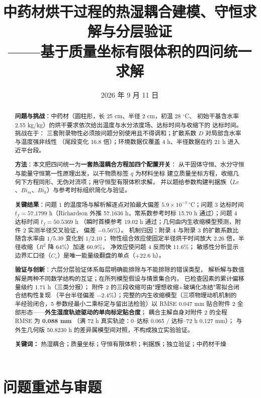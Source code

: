 \documentclass[12pt,a4paper]{ctexart}
\title{\textbf{中药材烘干过程的热湿耦合建模、守恒求解与分层验证}\\[2pt]
——基于质量坐标有限体积的四问统一求解}
\author{}
\date{2026 年 9 月 11 日}
\numberwithin{equation}{section}
\begin{document}
\maketitle

\begin{abstract}
\noindent\textbf{问题与挑战}：中药材（圆柱形，长 25 cm、半径 2 cm，初温 28 ${}^\circ$C、
初始干基含水率 2.55 kg/kg）的烘干要求依次给出温度与水分浓度场、达标时间与收缩下的
达标时间。挑战在于：
三套附录物性必须按问题分别使用且不得调和；扩散系数 $D$ 对局部含水率与温度强非线性
（尾段变化 16.8 倍）；环境数据仅覆盖 4 h、半径数据在约 21 h 进入近平台段。

\smallskip\noindent\textbf{方法}：本文把四问统一为\textbf{一套热湿耦合方程加四个配置开关}：
从干固体守恒、水分守恒与能量守恒第一性原理出发，以干物质标签 $q$ 为材料坐标
建立质量坐标方程，收缩几何下方程同形、无伪对流项；用守恒型有限体积求解，
并以题给参数构建判据族（$Le$、$Bi_m$、$Bi_h$）与参考时标组织简化与验证。

\smallskip\noindent\textbf{关键结果}：问题 1 的温度场与解析解逐点对拍最大偏差
$5.9\times10^{-7}\,^{\circ}$C；问题 3 达标时间 $t_f=57.1799$ h（Richardson 外推
57.1636 h，常系数参考时标 15.70 h 通过）；问题 4 达标时间 $t_f=50.5369$ h
（瞬时首模参考 19.02 h 通过；几何由内生收缩模型预测，附件 2 实测半径交叉验证，
偏差 $-0.56\%$）。
机制归因：附录 4 与附录 3 的扩散系数比随含水率由 $1/5.39$ 变化到 $1/2.10$；
物性组合效应使固定半径烘干时间放大 $2.26$ 倍，半径收缩（$R^2$ 降 64\%）加速 $60.9\%$，
净效应使问题 4 反而快 $11.6\%$；
敏感性分析显示边界汇口径（$C_e$）是唯一能量级翻盘的单点（$+22.6$ h）。

\smallskip\noindent\textbf{验证与创新}：六层分层验证体系每层明确能排除与不能排除的错误类型，
解析解与数值解是两种不同数学结构的互证；在所列模型假设与情景集合内，
已检查因素的累计偏移量级约 1.71 h（三类分报）；
附件 2 的三段收缩可由"理想收缩+玻璃化冻结"零拟合闭合结构性复现
（平台半径偏差 $-2.4\%$）；完整的内生收缩模型（三项物理动机机制的
半经验闭合，5 参数经最小二乘标定与留出法检验）以 RMSE 0.047 mm
贴合附件 2 全部形态——\textbf{外生湿度轨迹驱动的单向标定贴合度}；
耦合主解自身对附件 2 的全程 RMSE 为 \textbf{0.088 mm}
（满 72 h 真实轨迹：0--达标 0.065 / 达标--72 h 0.127 mm）；
与外生几何版 50.8230 h 的差异属模型间对照，不构成独立实验验证。

\smallskip\noindent\textbf{关键词：} 热湿耦合；质量坐标；守恒有限体积；判据族；独立验证；中药材干燥
\end{abstract}

\newpage
{\small\tableofcontents}
\newpage
\section{问题重述与审题}
\end{document}
